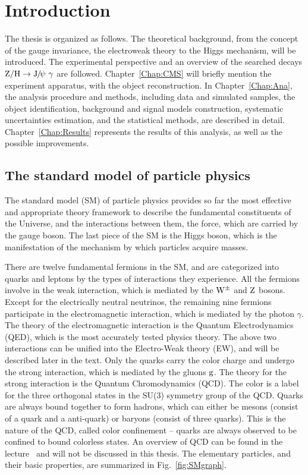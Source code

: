 \chapter{Introduction}
The thesis is organized as follows. The theoretical background, from the concept of the gauge invariance, the electroweak theory to the Higgs mechanism, will be introduced. The experimental perspective and an overview of the searched decays $\mathrm{Z} / \mathrm{H}\to{\mathrm{J}\hspace{-.08em}/\hspace{-.14em}\psi}\ \gamma$ are followed. Chapter~\ref{Chap:CMS} will briefly mention the experiment apparatus, with the object reconstruction. In Chapter~\ref{Chap:Ana}, the analysis procedure and methods, including data and simulated samples, the object identification, background and signal models construction, systematic uncertainties estimation, and the statistical methods, are described in detail. Chapter~\ref{Chap:Results} represents the results of this analysis, as well as the possible improvements.
  
\section{The standard model of particle physics}
The standard model (SM) of particle physics provides so far the most effective and appropriate theory framework to describe the fundamental constituents of the Universe, and the interactions between them, the force\footnotemark, which are carried by the gauge boson. The last piece of the SM is the Higgs boson, which is the manifestation of the mechanism by which particles acquire masses. 

There are twelve fundamental fermions in the SM, and are categorized into quarks and leptons by the types of interactions they experience. All the fermions involve in the weak interaction, which is mediated by the $\mathrm{W}^{\pm}$ and $\mathrm{Z}$ bosons. Except for the electrically neutral neutrinos, the remaining nine fermions participate in the electromagnetic interaction, which is mediated by the photon $\gamma$. The theory of the electromagnetic interaction is the Quantum Electrodynamics (QED), which is the most accurately tested physics theory. 
The above two interactions can be unified into the Electro-Weak theory (EW), and will be described later in the text.  
Only the quarks carry the color charge and undergo the strong interaction, which is mediated by the gluons $\mathrm{g}$. The theory for the strong interaction is the Quantum Chromodynamics (QCD). The color is a label for the three orthogonal states in the SU(3) symmetry group of the QCD.
Quarks are always bound together to form hadrons, which can either be mesons (consist of a quark and a anti-quark) or baryons (consist of three quarks). This is the nature of the QCD, called color confinement -- quarks are always observed to be confined to bound colorless states. An overview of QCD can be found in the lecture~\cite{Skands:2012ts} and will not be discussed in this thesis. The elementary particles, and their basic properties, are summarized in Fig.~\ref{fig:SMgraph}.

